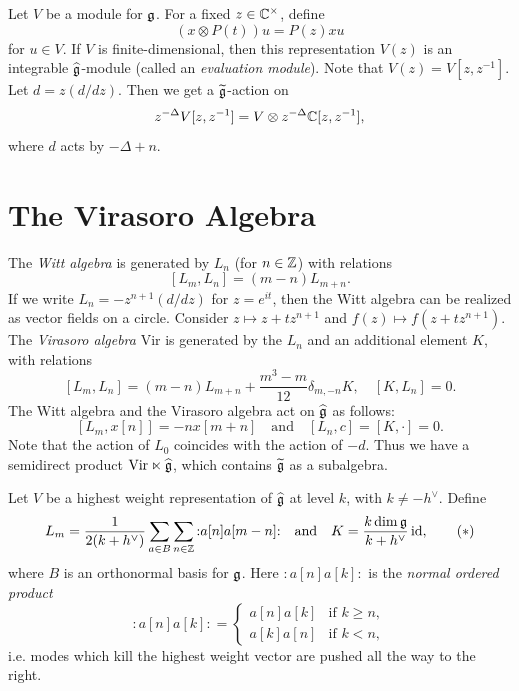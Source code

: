 \begin{remark}
  Let $V$ be a module for $\mathfrak{g}$. For a fixed
  $z \in \mathbb{C}^\times$, define
  \[
    (x \otimes P(t)) u = P(z) x u
  \]
  for $u \in V$. If $V$ is finite-dimensional,
  then this representation $V(z)$ is
  an integrable $\widehat{\mathfrak{g}}$-module (called
  an \emph{evaluation module}).
  Note that $V(z) = V[z, z^{-1}]$.
  Let $d = z (d / dz)$. Then we get a
  $\widetilde{\mathfrak{g}}$-action on
  \[z^{-\Delta} V[z, z^{-1}] = V \otimes z^{-\Delta} \mathbb{C}[z, z^{-1}],\]
  where $d$ acts by $-\Delta + n$.
\end{remark}

\section{The Virasoro Algebra}\label{sec:virasoro}

\begin{remark}
  The \emph{Witt algebra} is generated
  by $L_n$ (for $n \in \mathbb{Z}$) with relations
  \[
    [L_m, L_n]
    = (m - n) L_{m + n}.
  \]
  If we write $L_n = -z^{n + 1} (d / dz)$
  for $z = e^{it}$, then the Witt algebra
  can be realized as
  vector fields on a circle. Consider
  $z \mapsto z + t z^{n + 1}$ and
  $f(z) \mapsto f(z + t z^{n + 1})$.
  The \emph{Virasoro algebra}
  $\mathrm{Vir}$ is generated
  by the $L_n$ and an additional
  element $K$, with relations
  \[
    [L_m, L_n]
    = (m - n) L_{m + n}
    + \frac{m^3 - m}{12} \delta_{m, -n} K,
    \quad [K, L_n] = 0.
  \]
  The Witt algebra and the Virasoro algebra
  act on $\widehat{\mathfrak{g}}$ as follows:
  \[
    [L_m, x[n]]
    = -nx[m + n] \quad \text{and} \quad
    [L_n, c] = [K, \cdot] = 0.
  \]
  Note that the action of $L_0$ coincides with
  the action of $-d$.
  Thus we have a semidirect product
  $\mathrm{Vir} \ltimes \widehat{\mathfrak{g}}$,
  which contains $\widetilde{\mathfrak{g}}$ as a
  subalgebra.

  Let $V$ be a highest weight representation
  of $\widehat{\mathfrak{g}}$ at level $k$, with
  $k \ne -h^\vee$. Define
  \[
    L_m = \frac{1}{2(k + h^\vee)}
    \sum_{a \in B} \sum_{n \in \mathbb{Z}}
    {:} a[n] a[m - n] {:}
    \quad \text{and} \quad
    K = \frac{k \dim \mathfrak{g}}{k + h^\vee} \operatorname{id}, \tag{$*$}
  \]
  where $B$ is an orthonormal basis for $\mathfrak{g}$.
  Here ${:} a[n] a[k] {:}$ is the
  \emph{normal ordered product}
  \[
    {:} a[n] a[k] {:}
    =
    \begin{cases}
      a[n] a[k] & \text{if } k \ge n, \\
      a[k] a[n] & \text{if } k < n,
    \end{cases}
  \]
  i.e. modes which kill the highest
  weight vector are pushed all the way to the
  right.
\end{remark}

